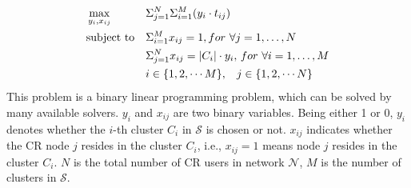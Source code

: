 \documentclass[times]{ettauth}
\newcommand{\ie}{i.e., }
\theoremstyle{mytheoremstyle}
\theoremstyle{mytheoremstyle}
\theoremstyle{mytheoremstyle}
\newcommand{\bigO}{\ensuremath{\mathcal{O}}}%
\begin{document}
 







\begin{equation}
\begin{aligned}
     &\max\limits_{y_i, x_{ij}} && \Sigma_{j=1}^N\Sigma_{i=1}^M (y_i\cdot t_{ij}) \\
     &\text{subject to}   && \Sigma_{i=1}^M x_{ij} = 1, for\,\,\forall j=1, \ldots, N \\
   &&& \Sigma_{j=1}^N x_{ij} = |C_i|\cdot y_i,\, for\,\,\forall i=1, \ldots, M \\
   &&& i\in \{1,2, \cdots M\}, \hspace{0.3cm} j\in \{1,2,\cdots N\}
\end{aligned}
\label{centralized_opt}
\end{equation}
This problem is a binary linear programming problem, which can be solved by many available solvers.
$y_i$ and $x_{ij}$ are two binary variables.
Being either 1 or 0, $y_i$ denotes whether the $i$-th cluster $C_i$ in $\mathcal{S}$ is chosen or not.
$x_{ij}$ indicates whether the CR node $j$ resides in the cluster $C_i$, \ie $x_{ij}=1$ means node $j$ resides in the cluster $C_i$. 
$N$ is the total number of CR users in network $\mathcal{N}$, $M$ is the number of clusters in $\mathcal{S}$.
\end{document}
